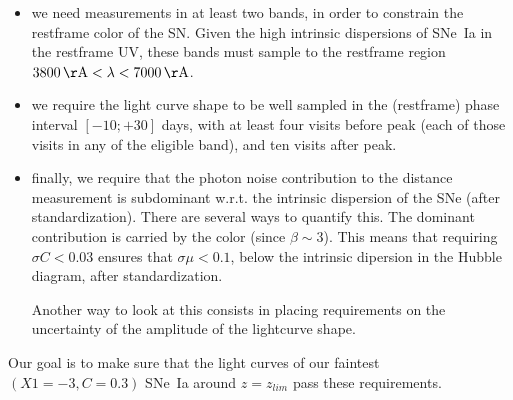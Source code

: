 \documentclass[\docopts]{\docclass}
\begin{document}
\begin{itemize}
\item we need measurements in at least two bands, in order to
  constrain the restframe color of the SN. Given the high intrinsic
  dispersions of SNe~Ia in the restframe UV, these bands must sample
  to the restframe region $3800 \angstrom < \lambda < 7000 \angstrom$.

\item we require the light curve shape to be well sampled in the
  (restframe) phase interval $[-10;+30]$ days, with at least four
  visits before peak (each of those visits in any of the eligible
  band), and ten visits after peak.
  
\item finally, we require that the photon noise contribution to the
  distance measurement is subdominant w.r.t. the intrinsic dispersion
  of the SNe (after standardization).  There are several ways to
  quantify this.  The dominant contribution is carried by the color
  (since $\beta \sim 3$). This means that requiring $\sigma C < 0.03$
  ensures that $\sigma \mu < 0.1$, below the intrinsic dipersion in
  the Hubble diagram, after standardization.

  Another way to look at this consists in placing requirements on the
  uncertainty of the amplitude of the lightcurve shape. 
\end{itemize}


Our goal is to make sure that the light curves of our faintest
$(X1=-3, C=0.3)$ SNe~Ia around $z = z_{lim}$ pass these requirements.








\end{document}
